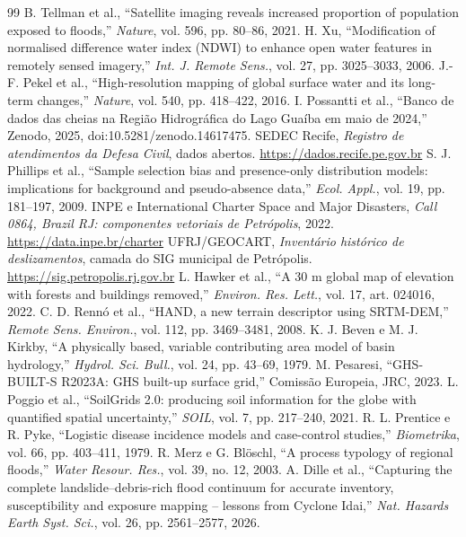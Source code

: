 \documentclass[conference]{IEEEtran}
\begin{document}
\begin{thebibliography}{99}
 B. Tellman et al., “Satellite imaging reveals increased proportion of population exposed to floods,” \emph{Nature}, vol. 596, pp. 80--86, 2021.
 H. Xu, “Modification of normalised difference water index (NDWI) to enhance open water features in remotely sensed imagery,” \emph{Int. J. Remote Sens.}, vol. 27, pp. 3025--3033, 2006.
 J.-F. Pekel et al., “High-resolution mapping of global surface water and its long-term changes,” \emph{Nature}, vol. 540, pp. 418--422, 2016.
 I. Possantti et al., “Banco de dados das cheias na Região Hidrográfica do Lago Guaíba em maio de 2024,” Zenodo, 2025, doi:10.5281/zenodo.14617475.
 SEDEC Recife, \emph{Registro de atendimentos da Defesa Civil}, dados abertos. \url{https://dados.recife.pe.gov.br}
 S. J. Phillips et al., “Sample selection bias and presence-only distribution models: implications for background and pseudo-absence data,” \emph{Ecol. Appl.}, vol. 19, pp. 181--197, 2009.
 INPE e International Charter Space and Major Disasters, \emph{Call 0864, Brazil RJ: componentes vetoriais de Petrópolis}, 2022. \url{https://data.inpe.br/charter}
 UFRJ/GEOCART, \emph{Inventário histórico de deslizamentos}, camada do SIG municipal de Petrópolis. \url{https://sig.petropolis.rj.gov.br}
 L. Hawker et al., “A 30 m global map of elevation with forests and buildings removed,” \emph{Environ. Res. Lett.}, vol. 17, art. 024016, 2022.
 C. D. Rennó et al., “HAND, a new terrain descriptor using SRTM-DEM,” \emph{Remote Sens. Environ.}, vol. 112, pp. 3469--3481, 2008.
 K. J. Beven e M. J. Kirkby, “A physically based, variable contributing area model of basin hydrology,” \emph{Hydrol. Sci. Bull.}, vol. 24, pp. 43--69, 1979.
 M. Pesaresi, “GHS-BUILT-S R2023A: GHS built-up surface grid,” Comissão Europeia, JRC, 2023.
 L. Poggio et al., “SoilGrids 2.0: producing soil information for the globe with quantified spatial uncertainty,” \emph{SOIL}, vol. 7, pp. 217--240, 2021.
 R. L. Prentice e R. Pyke, “Logistic disease incidence models and case-control studies,” \emph{Biometrika}, vol. 66, pp. 403--411, 1979.
 R. Merz e G. Blöschl, “A process typology of regional floods,” \emph{Water Resour. Res.}, vol. 39, no. 12, 2003.
 A. Dille et al., “Capturing the complete landslide--debris-rich flood continuum for accurate inventory, susceptibility and exposure mapping -- lessons from Cyclone Idai,” \emph{Nat. Hazards Earth Syst. Sci.}, vol. 26, pp. 2561--2577, 2026.

\end{thebibliography}
\end{document}

